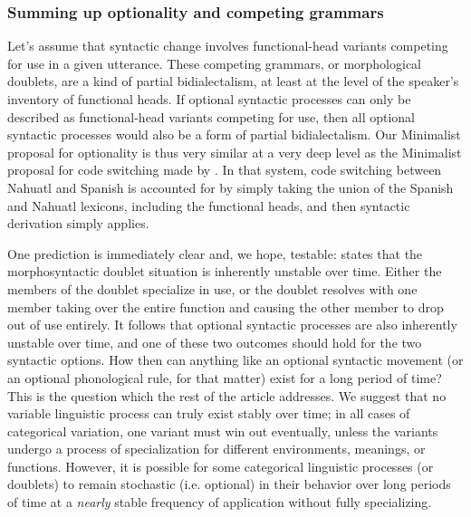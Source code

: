 \subsubsection{Summing up optionality and competing grammars}
Let's assume that syntactic change involves functional-head variants competing for use in a given utterance.
These competing grammars, or morphological doublets, are a kind of partial bidialectalism, at least at the level of the speaker's inventory of functional heads.
If optional syntactic processes can only be described as functional-head variants competing for use, then all optional syntactic processes would also be a form of partial bidialectalism.
Our Minimalist proposal for optionality is thus very similar at a very deep level as the Minimalist proposal for code switching made by \citet{MacSwann1997, MacSwann1999}.
In that system, code switching between Nahuatl and Spanish is accounted for by simply taking the union of the Spanish and Nahuatl lexicons, including the functional heads, and then syntactic derivation simply applies.




One prediction is immediately clear and, we hope, testable: \citet{kroch1989,kroch1994} states that the morphosyntactic doublet situation is inherently unstable over time.
Either the members of the doublet specialize in use, or the doublet resolves with one member taking over the entire function and causing the other member to drop out of use entirely.
It follows that optional syntactic processes are also inherently unstable over time, and one of these two outcomes should hold for the two syntactic options.
How then can anything like an optional syntactic movement (or an optional phonological rule, for that matter) exist for a long period of time? This is the question which the rest of the article addresses.
We suggest that no variable linguistic process can truly exist stably over time; in all cases of categorical variation, one variant must win out eventually, unless the variants undergo a process of specialization for different environments, meanings, or functions.
However, it is possible for some categorical linguistic processes (or doublets) to remain stochastic (i.e. optional) in their behavior over long periods of time at a \textsl{nearly} stable frequency of application without fully specializing. 


